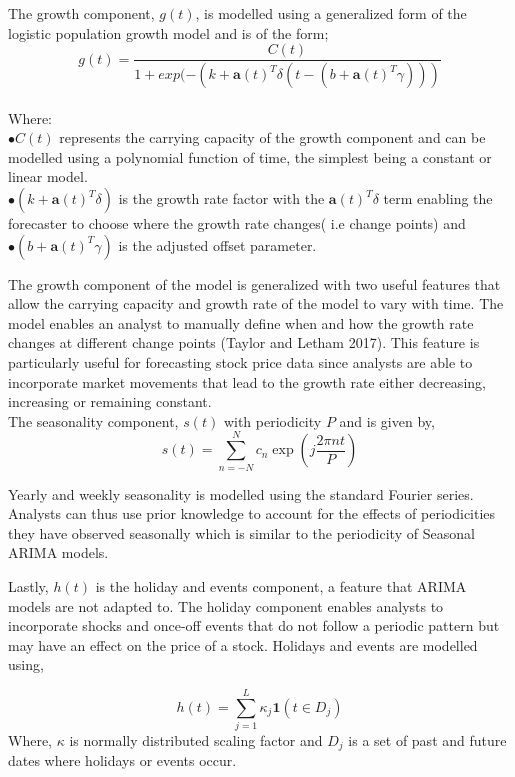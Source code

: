 \documentclass[12pt,a4paper]{article}
\numberwithin{equation}{section}
\numberwithin{figure}{section}
\numberwithin{table}{section}
\begin{document}
The growth component, \(g(t)\), is modelled using a generalized form of
the logistic population growth model and is of the form;\\
\[g(t) = \frac{C(t)}{1+exp(-(k+\boldsymbol{a}(t)^T \delta(t-(b+\boldsymbol{a}(t)^T \gamma)))}\]\\
Where:\\
\(\bullet C(t)\) represents the carrying capacity of the growth
component and can be modelled using a polynomial function of time, the
simplest being a constant or linear model.\\
\(\bullet (k+\boldsymbol{a}(t)^T\delta)\) is the growth rate factor with
the \(\boldsymbol{a}(t)^T\delta\) term enabling the forecaster to choose
where the growth rate changes( i.e change points) and\\
\(\bullet (b+\boldsymbol{a}(t)^T \gamma)\) is the adjusted offset
parameter.

The growth component of the model is generalized with two useful
features that allow the carrying capacity and growth rate of the model
to vary with time. The model enables an analyst to manually define when
and how the growth rate changes at different change points (Taylor and
Letham 2017). This feature is particularly useful for forecasting stock
price data since analysts are able to incorporate market movements that
lead to the growth rate either decreasing, increasing or remaining
constant.\\
The seasonality component, \(s(t)\) with periodicity \(P\) and is given
by, \[s(t) = \sum_{n = -N}^{N}c_n \exp(j\frac{2\pi nt}{P})\]

Yearly and weekly seasonality is modelled using the standard Fourier
series. Analysts can thus use prior knowledge to account for the effects
of periodicities they have observed seasonally which is similar to the
periodicity of Seasonal ARIMA models.

Lastly, \(h(t)\) is the holiday and events component, a feature that
ARIMA models are not adapted to. The holiday component enables analysts
to incorporate shocks and once-off events that do not follow a periodic
pattern but may have an effect on the price of a stock. Holidays and
events are modelled using,

\[ h(t) = \sum_{j = 1}^{L}\kappa_j \boldsymbol{1}(t \in D_j) \label{eqn5}
\] Where, \(\kappa\) is normally distributed scaling factor and \(D_j\)
is a set of past and future dates where holidays or events occur.
\end{document}
